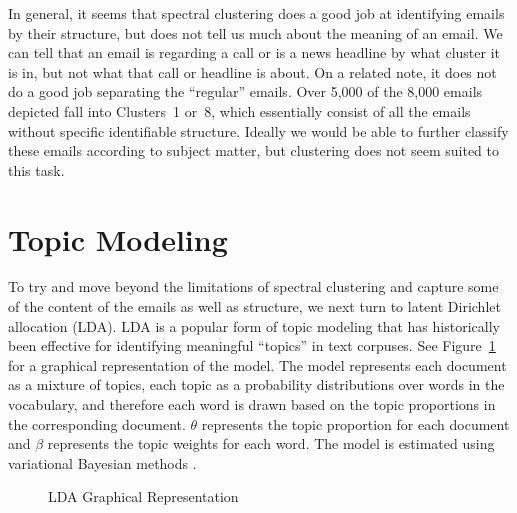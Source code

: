 \documentclass[12pt]{article}
\theoremstyle{definition}
\theoremstyle{algodesc}
\begin{document}
In general, it seems that spectral clustering does a good job at identifying emails by their structure, but does not tell us much about the meaning of an email. We can tell that an email is regarding a call or is a news headline by what cluster it is in, but not what that call or headline is about. On a related note, it does not do a good job separating the ``regular'' emails. Over 5,000 of the 8,000 emails depicted fall into Clusters~1 or~8, which essentially consist of all the emails without specific identifiable structure. Ideally we would be able to further classify these emails according to subject matter, but clustering does not seem suited to this task.


\section{Topic Modeling}
To try and move beyond the limitations of spectral clustering and capture some of the content of the emails as well as structure, we next turn to latent Dirichlet allocation (LDA). LDA is a popular form of topic modeling that has historically been effective for identifying meaningful ``topics'' in text corpuses. See Figure~\ref{fig:lda_graph} for a graphical representation of the model. The model represents each document as a mixture of topics, each topic as a probability distributions over words in the vocabulary, and therefore each word is drawn based on the topic proportions in the corresponding document. $\theta$ represents the topic proportion for each document and $\beta$ represents the topic weights for each word. The model is estimated using variational Bayesian methods \citep[for more details, see][]{bleilafferty09}.

\begin{figure}
\centering
{}
\caption{LDA Graphical Representation}
\label{fig:lda_graph}
\end{figure}
\end{document}
